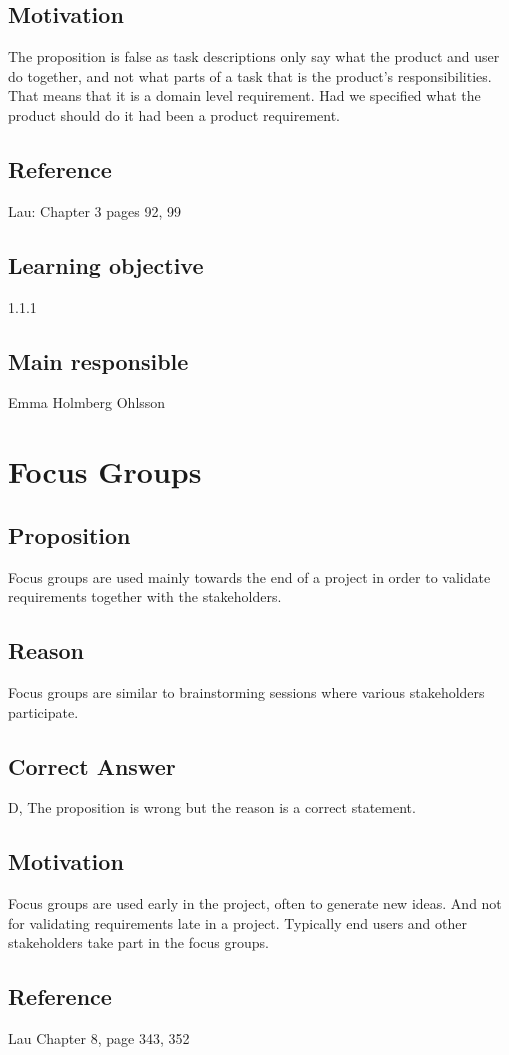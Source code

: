 \documentclass[a4paper]{article}
\begin{document}
\subsection{Motivation}
The proposition is false as task descriptions only say what the product and user do together, and not what parts of a task that is the product’s responsibilities. That means that it is a domain level requirement. Had we specified what the product should do it had been a product requirement.
\subsection{Reference}
Lau: Chapter 3 pages 92, 99
\subsection{Learning objective}
1.1.1
\subsection{Main responsible}
Emma Holmberg Ohlsson


\section{Focus Groups}
\subsection{Proposition}
Focus groups are used mainly towards the end of a project in order to validate requirements together with the stakeholders.
\subsection{Reason}
Focus groups are similar to brainstorming sessions where various stakeholders participate.
\subsection{Correct Answer}
D, The proposition is wrong but the reason is a correct statement.
\subsection{Motivation}
Focus groups are used early in the project, often to generate new ideas. And not for validating requirements late in a project. Typically end users and other stakeholders take part in the focus groups.
\subsection{Reference}
Lau Chapter 8, page 343, 352
\end{document}
